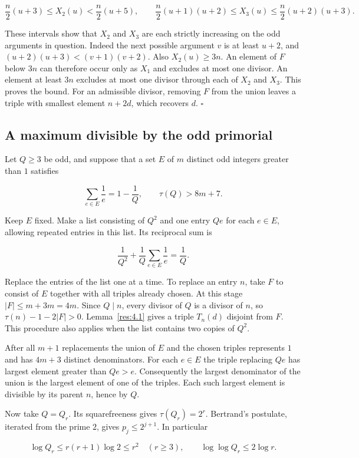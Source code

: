 \documentclass[11pt,a4paper]{article}
\begin{document}
\[
\frac n2(u+3)\le X_2(u)<\frac n2(u+5),\qquad
 \frac n2(u+1)(u+2)\le X_3(u)\le\frac n2(u+2)(u+3).
\]

These intervals show that $X_2$ and $X_3$ are each strictly increasing on the odd arguments in question. Indeed the next possible argument $v$ is at least $u+2$, and $(u+2)(u+3)<(v+1)(v+2)$. Also $X_2(u)\ge3n$. An element of $F$ below $3n$ can therefore occur only as $X_1$ and excludes at most one divisor. An element at least $3n$ excludes at most one divisor through each of $X_2$ and $X_3$. This proves the bound. For an admissible divisor, removing $F$ from the union leaves a triple with smallest element $n+2d$, which recovers $d$. $\square$

\subsection{A maximum divisible by the odd primorial}

Let $Q\ge3$ be odd, and suppose that a set $E$ of $m$ distinct odd integers greater than $1$ satisfies

\[
\sum_{e\in E}\frac1e=1-\frac1Q,\qquad \tau(Q)>8m+7.
\]

Keep $E$ fixed. Make a list consisting of $Q^2$ and one entry $Qe$ for each $e\in E$, allowing repeated entries in this list. Its reciprocal sum is

\[
\frac1{Q^2}+\frac1Q\sum_{e\in E}\frac1e=\frac1Q.
\]

Replace the entries of the list one at a time. To replace an entry $n$, take $F$ to consist of $E$ together with all triples already chosen. At this stage $|F|\le m+3m=4m$. Since $Q\mid n$, every divisor of $Q$ is a divisor of $n$, so $\tau(n)-1-2|F|>0$. Lemma~\ref{res:4.1} gives a triple $T_n(d)$ disjoint from $F$. This procedure also applies when the list contains two copies of $Q^2$.

After all $m+1$ replacements the union of $E$ and the chosen triples represents $1$ and has $4m+3$ distinct denominators. For each $e\in E$ the triple replacing $Qe$ has largest element greater than $Qe>e$. Consequently the largest denominator of the union is the largest element of one of the triples. Each such largest element is divisible by its parent $n$, hence by $Q$.

Now take $Q=Q_r$. Its squarefreeness gives $\tau(Q_r)=2^r$. Bertrand's postulate, iterated from the prime $2$, gives $p_j\le 2^{j+1}$. In particular

\[
\log Q_r\le r(r+1)\log 2\le r^2\quad(r\ge3),
 \qquad
 \log\log Q_r\le2\log r.
\]
\end{document}

